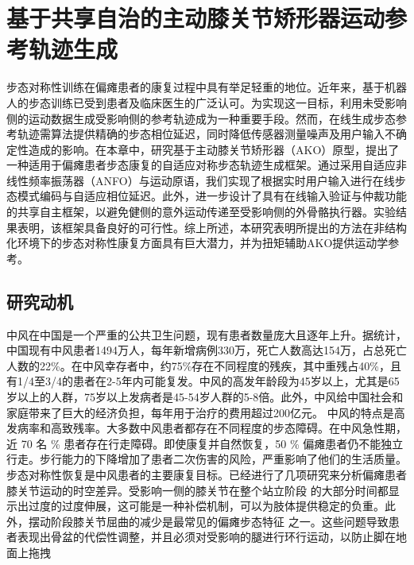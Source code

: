 \chapter{基于共享自治的主动膝关节矫形器运动参考轨迹生成}
步态对称性训练在偏瘫患者的康复过程中具有举足轻重的地位。近年来，基于机器人的步态训练已受到患者及临床医生的广泛认可。为实现这一目标，利用未受影响侧的运动数据生成受影响侧的参考轨迹成为一种重要手段。然而，在线生成步态参考轨迹需算法提供精确的步态相位延迟，同时降低传感器测量噪声及用户输入不确定性造成的影响。在本章中，研究基于主动膝关节矫形器（AKO）原型，提出了一种适用于偏瘫患者步态康复的自适应对称步态轨迹生成框架。通过采用自适应非线性频率振荡器（ANFO）与运动原语，我们实现了根据实时用户输入进行在线步态模式编码与自适应相位延迟。此外，进一步设计了具有在线输入验证与仲裁功能的共享自主框架，以避免健侧的意外运动传递至受影响侧的外骨骼执行器。实验结果表明，该框架具备良好的可行性。综上所述，本研究表明所提出的方法在非结构化环境下的步态对称性康复方面具有巨大潜力，并为扭矩辅助AKO提供运动学参考。
\section{研究动机}
中风在中国是一个严重的公共卫生问题，现有患者数量庞大且逐年上升。据统计，中国现有中风患者1494万人，每年新增病例330万，死亡人数高达154万，占总死亡人数的22\%。在中风幸存者中，约75\%存在不同程度的残疾，其中重残占40\%，且有1/4至3/4的患者在2-5年内可能复发。中风的高发年龄段为45岁以上，尤其是65岁以上的人群，75岁以上发病者是45-54岁人群的5-8倍。此外，中风给中国社会和家庭带来了巨大的经济负担，每年用于治疗的费用超过200亿元。
中风的特点是高发病率和高致残率。大多数中风患者都存在不同程度的步态障碍。在中风急性期，近 70 名 \% 患者存在行走障碍。即使康复并自然恢复，50 \% 偏瘫患者仍不能独立行走\cite{jorgensenRecoveryWalkingFunction1995}。步行能力的下降增加了患者二次伤害的风险，严重影响了他们的生活质量\cite{balabanGaitDisturbancesPatients2014,yelnikClinicalGuideAssess1999}。步态对称性恢复是中风患者的主要康复目标。已经进行了几项研究来分析偏瘫患者膝关节运动的时空差异。受影响一侧的膝关节在整个站立阶段    \cite{woolleyCharacteristicsGaitHemiplegia2015}    的大部分时间都显示出过度的过度伸展，这可能是一种补偿机制，可以为肢体提供稳定的负重。此外，摆动阶段膝关节屈曲的减少是最常见的偏瘫步态特征    \cite{lucareliALTERATIONLOADRESPONSEMECHANISM2006,campaniniMethodDifferentiateCauses2013}    之一。这些问题导致患者表现出骨盆的代偿性调整，并且必须对受影响的腿进行环行运动，以防止脚在地面上拖拽    \cite{cruzBiomechanicalImpairmentsGait2009} 

